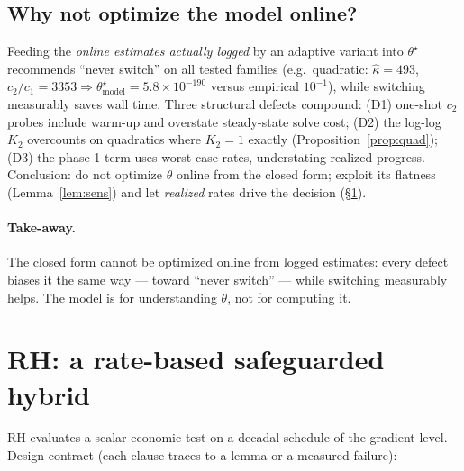 ﻿\documentclass[10pt]{article}
\begin{document}
\subsection{Why not optimize the model online?}
Feeding the \emph{online estimates actually logged} by an adaptive
variant into $\theta^\star$ recommends ``never switch'' on all tested
families (e.g.\ quadratic: $\hat\kappa=493$,
$c_2/c_1=3353\Rightarrow\theta^\star_{\text{model}}=5.8\times10^{-190}$
versus empirical $10^{-1}$), while switching measurably saves
wall time. Three structural defects compound: (D1) one-shot $c_2$
probes include warm-up and overstate steady-state solve cost; (D2) the
log-log $K_2$ overcounts on quadratics where $K_2=1$ exactly
(Proposition~\ref{prop:quad}); (D3) the phase-1 term uses worst-case
rates, understating realized progress. Conclusion: do not optimize
$\theta$ online from the closed form; exploit its flatness
(Lemma~\ref{lem:sens}) and let \emph{realized} rates drive the decision
(\S\ref{sec:rh}).

\paragraph{Take-away.} The closed form cannot be optimized online from
logged estimates: every defect biases it the same way --- toward
``never switch'' --- while switching measurably helps. The model is for
understanding $\theta$, not for computing it.

\section{RH: a rate-based safeguarded hybrid}\label{sec:rh}

RH evaluates a scalar economic test on a decadal schedule of the
gradient level. Design contract (each clause traces to a lemma or a
measured failure):
\end{document}
